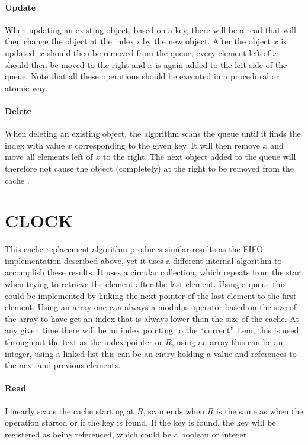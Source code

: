 \documentclass[pdftex,a4paper,12pt,twoside]{report}
\begin{document}
\paragraph{Update} When updating an existing object, based on a key, there will be a read that will then change the object at the index $i$ by the new object. After the object $x$ is updated, $x$ should then be removed from the queue, every element left of $x$ should then be moved to the right and $x$ is again added to the left side of the queue. Note that all these operations should be executed in a procedural or atomic way.
\paragraph{Delete} When deleting an existing object, the algorithm scans the queue until it finds the index with value $x$ corresponding to the given key. It will then remove $x$ and move all elements left of $x$ to the right. The next object added to the queue will therefore not cause the object (completely) at the right to be removed from the cache \citep{rao1978performance}.
\section{CLOCK}
This cache replacement algorithm produces similar results as the FIFO implementation described above, yet it uses a different internal algorithm to accomplish these results. It uses a circular collection, which repeats from the start when trying to retrieve the element after the last element. Using a queue this could be implemented by linking the next pointer of the last element to the first element. Using an array one can always a modulus operator based on the size of the array to have get an index that is always lower than the size of the cache. At any given time there will be an index pointing to the ``current'' item, this is used throughout the text as the index pointer or $R$, using an array this can be an integer, using a linked list this can be an entry holding a value and references to the next and previous elements.
\paragraph{Read} Linearly scans the cache starting at $R$, scan ends when $R$ is the same as when the operation started or if the key is found. If the key is found, the key will be registered as being referenced, which could be a boolean or integer.
\end{document}
